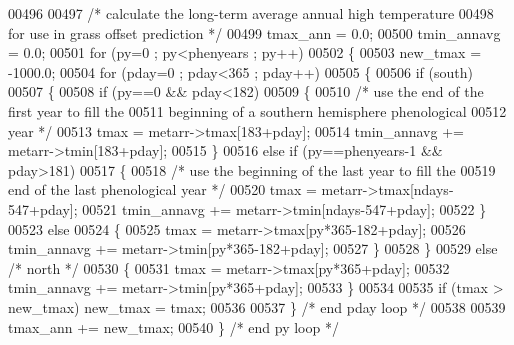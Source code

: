 \begin{DoxyCode}
{{00496             
00497             \textcolor{comment}{/* calculate the long-term average annual high temperature}
00498 \textcolor{comment}{            for use in grass offset prediction */}
00499             tmax\_ann = 0.0;
00500             tmin\_annavg = 0.0;
00501             \textcolor{keywordflow}{for} (py=0 ; py<phenyears ; py++)
00502             \{
00503                 new\_tmax = -1000.0;
00504                 \textcolor{keywordflow}{for} (pday=0 ; pday<365 ; pday++)
00505                 \{
00506                     \textcolor{keywordflow}{if} (south)
00507                     \{
00508                         \textcolor{keywordflow}{if} (py==0 && pday<182)
00509                         \{
00510                             \textcolor{comment}{/* use the end of the first year to fill the }
00511 \textcolor{comment}{                            beginning of a southern hemisphere phenological}
00512 \textcolor{comment}{                            year */}
00513                             tmax = metarr->tmax[183+pday];
00514                             tmin\_annavg += metarr->tmin[183+pday];
00515                         \}
00516                         \textcolor{keywordflow}{else} \textcolor{keywordflow}{if} (py==phenyears-1 && pday>181)
00517                         \{
00518                             \textcolor{comment}{/* use the beginning of the last year to fill the}
00519 \textcolor{comment}{                            end of the last phenological year */}
00520                             tmax = metarr->tmax[ndays-547+pday];
00521                             tmin\_annavg += metarr->tmin[ndays-547+pday];
00522                         \}
00523                         \textcolor{keywordflow}{else}
00524                         \{
00525                             tmax = metarr->tmax[py*365-182+pday];
00526                             tmin\_annavg += metarr->tmin[py*365-182+pday];
00527                         \}
00528                     \}
00529                     \textcolor{keywordflow}{else} \textcolor{comment}{/* north */}
00530                     \{
00531                         tmax = metarr->tmax[py*365+pday];
00532                         tmin\_annavg += metarr->tmin[py*365+pday];
00533                     \}
00534                     
00535                     \textcolor{keywordflow}{if} (tmax > new\_tmax) new\_tmax = tmax;
00536                     
00537                 \} \textcolor{comment}{/* end pday loop */}
00538                 
00539                 tmax\_ann += new\_tmax;
00540             \} \textcolor{comment}{/* end py loop */}
}}
\end{DoxyCode}
